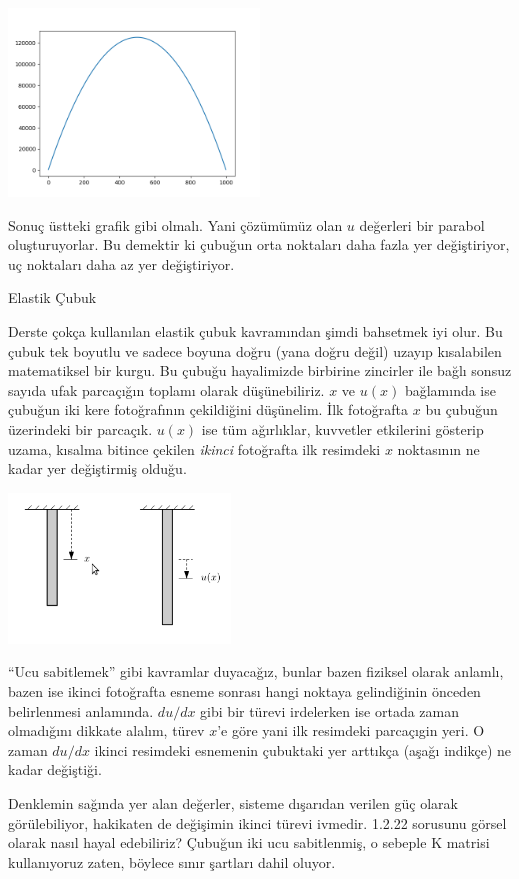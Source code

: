 \documentclass[12pt,fleqn]{article}\usepackage{../../common}
\begin{document}
\includegraphics[height=5cm]{1-1-22.png}

Sonuç üstteki grafik gibi olmalı. Yani çözümümüz olan $u$ değerleri bir parabol
oluşturuyorlar. Bu demektir ki çubuğun orta noktaları daha fazla yer
değiştiriyor, uç noktaları daha az yer değiştiriyor.

Elastik Çubuk

Derste çokça kullanılan elastik çubuk kavramından şimdi bahsetmek iyi olur. Bu
çubuk tek boyutlu ve sadece boyuna doğru (yana doğru değil) uzayıp kısalabilen
matematiksel bir kurgu. Bu çubuğu hayalimizde birbirine zincirler ile bağlı
sonsuz sayıda ufak parcaçığın toplamı olarak düşünebiliriz. $x$ ve $u(x)$
bağlamında ise çubuğun iki kere fotoğrafının çekildiğini düşünelim. İlk
fotoğrafta $x$ bu çubuğun üzerindeki bir parcaçık. $u(x)$ ise tüm ağırlıklar,
kuvvetler etkilerini gösterip uzama, kısalma bitince çekilen {\em ikinci}
fotoğrafta ilk resimdeki $x$ noktasının ne kadar yer değiştirmiş olduğu.

\includegraphics[height=4cm]{1_7.png}

``Ucu sabitlemek'' gibi kavramlar duyacağız, bunlar bazen fiziksel olarak
anlamlı, bazen ise ikinci fotoğrafta esneme sonrası hangi noktaya
gelindiğinin önceden belirlenmesi anlamında. $du/dx$ gibi bir türevi
irdelerken ise ortada zaman olmadığını dikkate alalım, türev $x$'e göre
yani ilk resimdeki parcaçıgin yeri. O zaman $du/dx$ ikinci resimdeki
esnemenin çubuktaki yer arttıkça (aşağı indikçe) ne kadar değiştiği. 

Denklemin sağında yer alan değerler, sisteme dışarıdan verilen güç olarak
görülebiliyor, hakikaten de değişimin ikinci türevi ivmedir. 1.2.22 sorusunu
görsel olarak nasıl hayal edebiliriz? Çubuğun iki ucu sabitlenmiş, o sebeple K
matrisi kullanıyoruz zaten, böylece sınır şartları dahil oluyor.
\end{document}
